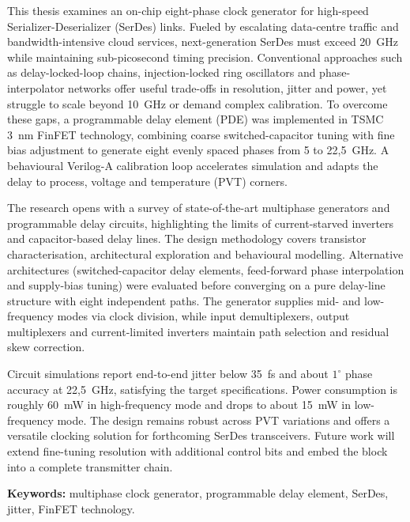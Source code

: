 This thesis examines an on-chip eight-phase clock generator for high-speed Serializer-Deserializer (SerDes) links. Fueled by escalating data-centre traffic and bandwidth-intensive cloud services, next-generation SerDes must exceed 20~GHz while maintaining sub-picosecond timing precision. Conventional approaches such as delay-locked-loop chains, injection-locked ring oscillators and phase-interpolator networks offer useful trade-offs in resolution, jitter and power, yet struggle to scale beyond 10~GHz or demand complex calibration. To overcome these gaps, a programmable delay element (PDE) was implemented in TSMC 3~nm FinFET technology, combining coarse switched-capacitor tuning with fine bias adjustment to generate eight evenly spaced phases from 5 to 22{,}5~GHz. A behavioural Verilog-A calibration loop accelerates simulation and adapts the delay to process, voltage and temperature (PVT) corners.

The research opens with a survey of state-of-the-art multiphase generators and programmable delay circuits, highlighting the limits of current-starved inverters and capacitor-based delay lines. The design methodology covers transistor characterisation, architectural exploration and behavioural modelling. Alternative architectures (switched-capacitor delay elements, feed-forward phase interpolation and supply-bias tuning) were evaluated before converging on a pure delay-line structure with eight independent paths. The generator supplies mid- and low-frequency modes via clock division, while input demultiplexers, output multiplexers and current-limited inverters maintain path selection and residual skew correction.

Circuit simulations report end-to-end jitter below 35~fs and about $1^{\circ}$ phase accuracy at 22{,}5~GHz, satisfying the target specifications. Power consumption is roughly 60~mW in high-frequency mode and drops to about 15~mW in low-frequency mode. The design remains robust across PVT variations and offers a versatile clocking solution for forthcoming SerDes transceivers. Future work will extend fine-tuning resolution with additional control bits and embed the block into a complete transmitter chain.

\medskip
\noindent\textbf{Keywords:} multiphase clock generator, programmable delay element, SerDes, jitter, FinFET technology.
